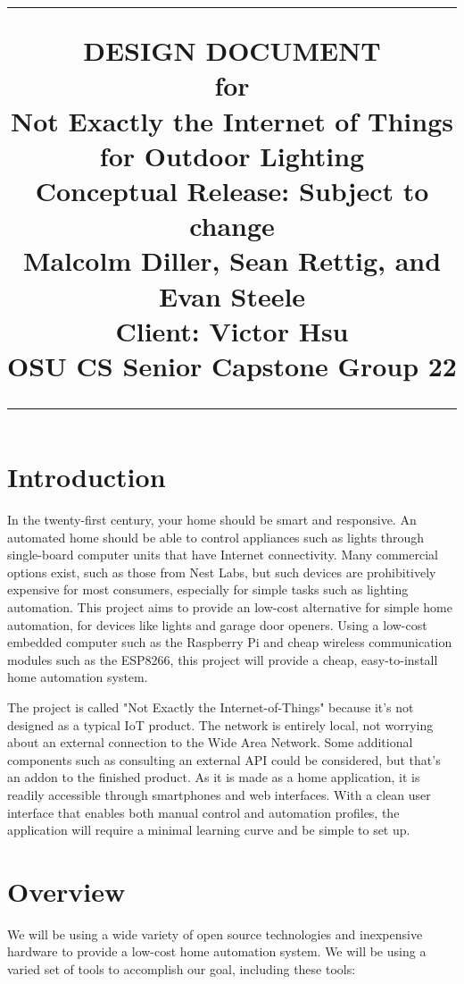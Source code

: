 \documentclass[oneside,openright]{book}
\title{
	\flushright
		\rule{16cm}{5pt}\vskip1cm
		\Huge{DESIGN DOCUMENT}\\
	for\\
		\vspace{2cm}
	Not Exactly the Internet of Things for Outdoor Lighting\\
		\vspace{2cm}
	\LARGE{Conceptual Release:}
	\vspace{2cm}
	\LARGE{Subject to change\\}
	\vspace{2cm}
	Malcolm Diller, Sean Rettig, and Evan Steele\\
        Client: Victor Hsu\\
        OSU CS Senior Capstone Group 22
		\vfill
		\rule{16cm}{5pt}
}
\date{}
\begin{document}
\maketitle
\tableofcontents
\newpage
{} 
\section{Introduction}

In the twenty-first century, your home should be smart and responsive. An
automated home should be able to control appliances such as lights through
single-board computer units that have Internet connectivity. Many commercial
options exist, such as those from Nest Labs, but such devices are prohibitively
expensive for most consumers, especially for simple tasks such as lighting
automation. This project aims to provide an low-cost alternative for simple
home automation, for devices like lights and garage door openers. Using a
low-cost embedded computer such as the Raspberry Pi and cheap wireless
communication modules such as the ESP8266, this project will provide a cheap,
easy-to-install home automation system.

The project is called "Not Exactly the Internet-of-Things" because it's not
designed as a typical IoT product. The network is entirely local, not worrying
about an external connection to the Wide Area Network. Some additional
components such as consulting an external API could be considered, but that's
an addon to the finished product. As it is made as a home application, it is
readily accessible through smartphones and web interfaces. With a clean user
interface that enables both manual control and automation profiles, the
application will require a minimal learning curve and be simple to set up.  

\section{Overview}

We will be using a wide variety of open source technologies and inexpensive
hardware to provide a low-cost home automation system. We will be using a
varied set of tools to accomplish our goal, including these tools:
\end{document}
